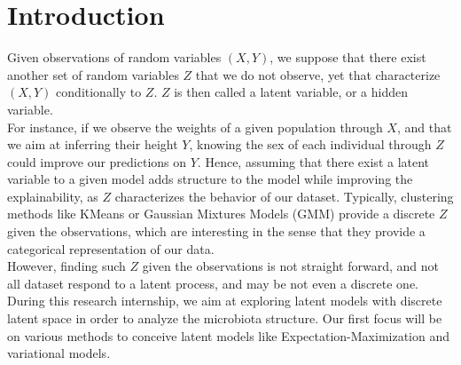 \section{Introduction}


Given observations of random variables $(X,Y)$, we suppose that there exist another set of random variables $Z$ that we do not observe,
yet that characterize $(X,Y)$ conditionally to $Z$.
$Z$ is then called a latent variable, or a hidden variable. \\

For instance, if we observe the weights of a given population through $X$, and that we aim at inferring their height $Y$, knowing the
sex of each individual through $Z$ could improve our predictions on $Y$.
Hence, assuming that there exist a latent variable to a given model adds structure to the model while improving the explainability,
as $Z$ characterizes the behavior of our dataset.
Typically, clustering methods like KMeans or Gaussian Mixtures Models (GMM) provide a discrete $Z$ given the observations, which are
interesting in the sense that they provide a categorical representation of our data. \\

However, finding such $Z$ given the observations is not straight forward, and not all dataset respond to a latent process, and may be not even a discrete one. \\

During this research internship, we aim at exploring latent models with discrete latent space in order to analyze the microbiota structure.
Our first focus will be on various methods to conceive latent models like Expectation-Maximization and variational models.


